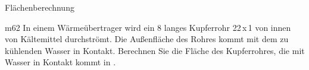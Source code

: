 \begin{aufgabe}[Technologie]{Flächenberechnung}
    \begin{teilaufgabe}[ohnenummer]{m}{6}{2}
        In einem Wärmeübertrager wird ein \unit{8}{\metre} langes Kupferrohr
        22\,x\,1 von innen von Kältemittel durchströmt. Die Außenfläche des
        Rohres kommt mit dem zu kühlenden Wasser in Kontakt. Berechnen Sie die
        Fläche des Kupferrohres, die mit Wasser in Kontakt kommt in
        \square\metre.
    \end{teilaufgabe}
    \begin{loesung}
    \end{loesung}
\end{aufgabe}


